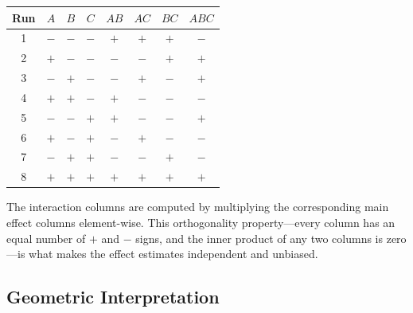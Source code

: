 \documentclass[11pt]{book}
\begin{document}
\begin{center}
\begin{tabular}{cccccccc}
\toprule
Run & $A$ & $B$ & $C$ & $AB$ & $AC$ & $BC$ & $ABC$ \\
\midrule
1 & $-$ & $-$ & $-$ & $+$ & $+$ & $+$ & $-$ \\
2 & $+$ & $-$ & $-$ & $-$ & $-$ & $+$ & $+$ \\
3 & $-$ & $+$ & $-$ & $-$ & $+$ & $-$ & $+$ \\
4 & $+$ & $+$ & $-$ & $+$ & $-$ & $-$ & $-$ \\
5 & $-$ & $-$ & $+$ & $+$ & $-$ & $-$ & $+$ \\
6 & $+$ & $-$ & $+$ & $-$ & $+$ & $-$ & $-$ \\
7 & $-$ & $+$ & $+$ & $-$ & $-$ & $+$ & $-$ \\
8 & $+$ & $+$ & $+$ & $+$ & $+$ & $+$ & $+$ \\
\bottomrule
\end{tabular}
\end{center}

The interaction columns are computed by multiplying the corresponding main
effect columns element-wise. This orthogonality property---every column has an
equal number of $+$ and $-$ signs, and the inner product of any two columns is
zero---is what makes the effect estimates independent and unbiased.

\subsection{Geometric Interpretation}
\end{document}
